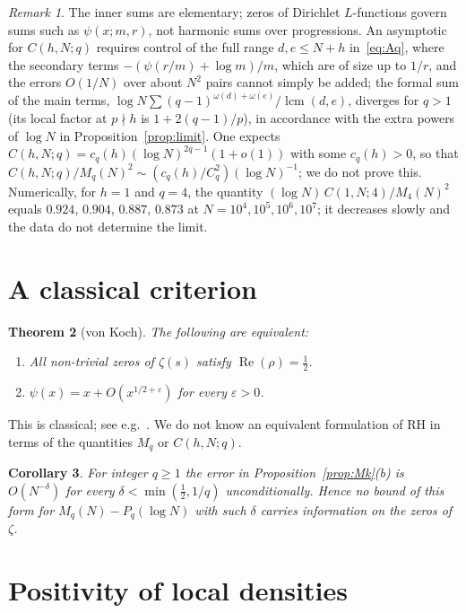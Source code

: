 \documentclass[11pt]{amsart}
\newtheorem{theorem}{Theorem}[section]
\newtheorem{corollary}[theorem]{Corollary}
\theoremstyle{definition}
\theoremstyle{remark}
\newtheorem{remark}[theorem]{Remark}
\renewcommand{\Re}{\operatorname{Re}}
\newcommand{\half}{\tfrac12}
\newcommand{\om}{\omega}
\begin{document}
\begin{remark}
  The inner sums are elementary; zeros of Dirichlet $L$-functions govern sums such as
  $\psi(x;m,r)$, not harmonic sums over progressions.  An asymptotic for $C(h,N;q)$
  requires control of the full range $d,e\le N+h$ in~\eqref{eq:Aq}, where the secondary terms $-(\psi(r/m)+\log m)/m$, which are of size up to $1/r$, and the errors $O(1/N)$ over about $N^2$ pairs cannot simply be added; the formal sum of the main terms,
  $\log N\sum(q-1)^{\om(d)+\om(e)}/\operatorname{lcm}(d,e)$, diverges for $q>1$ (its local
  factor at $p\nmid h$ is $1+2(q-1)/p$), in accordance with the extra powers of
  $\log N$ in Proposition~\ref{prop:limit}.
  One expects $C(h,N;q)=c_q(h)(\log N)^{2q-1}(1+o(1))$ with some $c_q(h)>0$, so that
  $C(h,N;q)/M_q(N)^2\sim(c_q(h)/C_q^2)(\log N)^{-1}$; we do not prove this.  Numerically,
  for $h=1$ and $q=4$, the quantity $(\log N)\,C(1,N;4)/M_4(N)^2$ equals $0.924$, $0.904$, $0.887$, $0.873$ at $N=10^4,10^5,10^6,10^7$; it decreases slowly and the data do not determine the limit.
\end{remark}

\section{A classical criterion}
\label{sec:rh-equiv}

\begin{theorem}[von Koch]\label{thm:rh}
  The following are equivalent:
  \begin{enumerate}
    \item[(RH)] All non-trivial zeros of $\zeta(s)$ satisfy $\Re(\rho)=\half$.
    \item[(PNT)] $\psi(x)=x+O(x^{1/2+\varepsilon})$ for every $\varepsilon>0$.
  \end{enumerate}
\end{theorem}
This is classical; see e.g.\ \cite[Ch.~II.4]{SD}.  We do not know an equivalent formulation
of RH in terms of the quantities $M_q$ or $C(h,N;q)$.

\begin{corollary}
  For integer $q\ge1$ the error in Proposition~\ref{prop:Mk}(b) is $O(N^{-\delta})$ for every
  $\delta<\min(\half,1/q)$ unconditionally.  Hence no bound of this form for
  $M_q(N)-P_q(\log N)$ with such $\delta$ carries information on the zeros of $\zeta$.
\end{corollary}

\section{Positivity of local densities}
\label{sec:impossibility}
\end{document}
